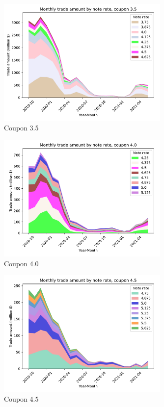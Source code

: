 \documentclass[11pt,a4paper]{article}
\begin{document}
\begin{figure}[h]
  \includegraphics[width=0.75\textwidth]{../results/figures/ob_monthly_trade_amount_by_noterate_c35.0_area_legend_colors_right.pdf}
  \caption{Coupon 3.5}
  \end{figure}

  \pagebreak

\begin{figure}[h]
  \includegraphics[width=0.75\textwidth]{../results/figures/ob_monthly_trade_amount_by_noterate_c40.0_area_legend_colors_right.pdf}
  \caption{Coupon 4.0}
  \end{figure}

\begin{figure}[h]
  \includegraphics[width=0.75\textwidth]{../results/figures/ob_monthly_trade_amount_by_noterate_c45.0_area_legend_colors_right.pdf}
  \caption{Coupon 4.5}
  \end{figure}
\end{document}
